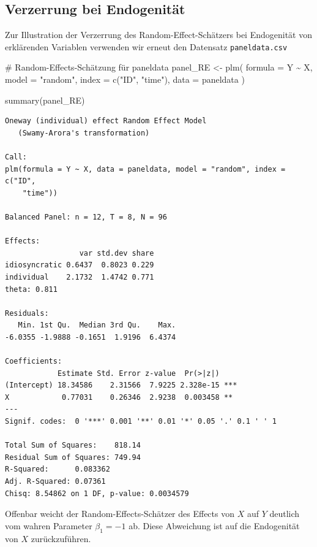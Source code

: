 \documentclass[
  a4paper,
  DIV=11,
  oneside]{scrreprt}
\newenvironment{Shaded}{\begin{snugshade}}{\end{snugshade}}
\newcommand{\AttributeTok}[1]{\textcolor[rgb]{0.40,0.45,0.13}{#1}}
\newcommand{\CommentTok}[1]{\textcolor[rgb]{0.37,0.37,0.37}{#1}}
\newcommand{\FunctionTok}[1]{\textcolor[rgb]{0.28,0.35,0.67}{#1}}
\newcommand{\NormalTok}[1]{\textcolor[rgb]{0.00,0.23,0.31}{#1}}
\newcommand{\OtherTok}[1]{\textcolor[rgb]{0.00,0.23,0.31}{#1}}
\newcommand{\SpecialCharTok}[1]{\textcolor[rgb]{0.37,0.37,0.37}{#1}}
\newcommand{\StringTok}[1]{\textcolor[rgb]{0.13,0.47,0.30}{#1}}
\begin{document}
\subsection{Verzerrung bei
Endogenität}\label{verzerrung-bei-endogenituxe4t}

Zur Illustration der Verzerrung des Random-Effect-Schätzers bei
Endogenität von erklärenden Variablen verwenden wir erneut den Datensatz
\texttt{paneldata.csv}

\begin{Shaded}
\begin{Highlighting}[]
\CommentTok{\# Random{-}Effects{-}Schätzung für \textasciigrave{}paneldata\textasciigrave{}}
\NormalTok{panel\_RE }\OtherTok{\textless{}{-}} \FunctionTok{plm}\NormalTok{(}
  \AttributeTok{formula =}\NormalTok{ Y }\SpecialCharTok{\textasciitilde{}}\NormalTok{ X,  }
  \AttributeTok{model =} \StringTok{"random"}\NormalTok{,}
  \AttributeTok{index =} \FunctionTok{c}\NormalTok{(}\StringTok{"ID"}\NormalTok{, }\StringTok{"time"}\NormalTok{),  }
  \AttributeTok{data =}\NormalTok{ paneldata}
\NormalTok{)}

\FunctionTok{summary}\NormalTok{(panel\_RE)}
\end{Highlighting}
\end{Shaded}

\begin{verbatim}
Oneway (individual) effect Random Effect Model 
   (Swamy-Arora's transformation)

Call:
plm(formula = Y ~ X, data = paneldata, model = "random", index = c("ID", 
    "time"))

Balanced Panel: n = 12, T = 8, N = 96

Effects:
                 var std.dev share
idiosyncratic 0.6437  0.8023 0.229
individual    2.1732  1.4742 0.771
theta: 0.811

Residuals:
   Min. 1st Qu.  Median 3rd Qu.    Max. 
-6.0355 -1.9888 -0.1651  1.9196  6.4374 

Coefficients:
            Estimate Std. Error z-value  Pr(>|z|)    
(Intercept) 18.34586    2.31566  7.9225 2.328e-15 ***
X            0.77031    0.26346  2.9238  0.003458 ** 
---
Signif. codes:  0 '***' 0.001 '**' 0.01 '*' 0.05 '.' 0.1 ' ' 1

Total Sum of Squares:    818.14
Residual Sum of Squares: 749.94
R-Squared:      0.083362
Adj. R-Squared: 0.07361
Chisq: 8.54862 on 1 DF, p-value: 0.0034579
\end{verbatim}

Offenbar weicht der Random-Effects-Schätzer des Effects von \(X\) auf
\(Y\) deutlich vom wahren Parameter \(\beta_1 = -1\) ab. Diese
Abweichung ist auf die Endogenität von \(X\) zurückzuführen.
\end{document}
